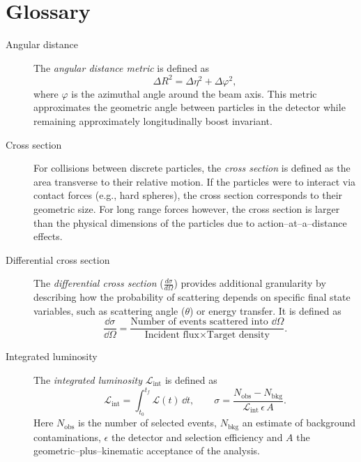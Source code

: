 \chapter{Glossary}

\begin{description}

\item [Angular distance]
    The \emph{angular distance metric} is defined as
    \[
        \Delta R^2 = \Delta\eta^2 + \Delta\varphi^2,
    \]
    where \(\varphi\) is the azimuthal angle around the beam axis.
    This metric approximates the geometric angle between particles in the detector while remaining approximately longitudinally boost invariant.

\item [Cross section]
        For collisions between discrete particles, the \emph{cross section} is defined as the area transverse to their relative motion.
        If the particles were to interact via contact forces (e.g., hard spheres), the cross section corresponds to their geometric size.
        For long range forces however, the cross section is larger than the physical dimensions of the particles due to action--at--a--distance effects.

\item [Differential cross section]
        The \emph{differential cross section} (\(\frac{d\sigma}{d\Omega}\)) provides additional granularity by describing how the probability of scattering depends on specific final state variables, such as scattering angle (\(\theta\)) or energy transfer.
        It is defined as
        \begin{equation}
            \frac{\dd\sigma}{\dd\Omega} = \frac{\text{Number of events scattered into } \dd\Omega}{\text{Incident flux} \times \text{Target density}}.
        \end{equation}

\item [Integrated luminosity]
            The \emph{integrated luminosity} \(\mathcal{L}_{\text{int}}\) is defined as
            \begin{equation}
                \mathcal{L}_{\text{int}}
                = \int_{t_0}^{t_f} \mathcal{L}(t)\,\dd t,
                \qquad
                \sigma
                = \frac{N_{\text{obs}} - N_{\text{bkg}}}
                       {\mathcal{L}_{\text{int}}\,\epsilon\,A}.
              \end{equation}
              Here \(N_{\text{obs}}\) is the number of selected events, \(N_{\text{bkg}}\) an estimate of background contaminations, \(\epsilon\) the detector and selection efficiency and \(A\) the geometric--plus--kinematic acceptance of the analysis.


\end{description}
